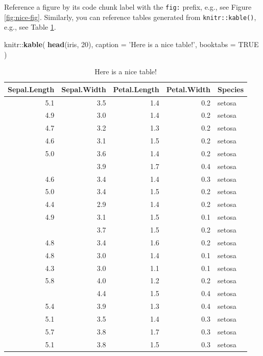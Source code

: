 \documentclass[]{book}
\newenvironment{Shaded}{\begin{snugshade}}{\end{snugshade}}
\newcommand{\KeywordTok}[1]{\textcolor[rgb]{0.13,0.29,0.53}{\textbf{{#1}}}}
\newcommand{\DataTypeTok}[1]{\textcolor[rgb]{0.13,0.29,0.53}{{#1}}}
\newcommand{\DecValTok}[1]{\textcolor[rgb]{0.00,0.00,0.81}{{#1}}}
\newcommand{\StringTok}[1]{\textcolor[rgb]{0.31,0.60,0.02}{{#1}}}
\newcommand{\OtherTok}[1]{\textcolor[rgb]{0.56,0.35,0.01}{{#1}}}
\newcommand{\NormalTok}[1]{{#1}}
\theoremstyle{definition}
\theoremstyle{definition}
\theoremstyle{definition}
\theoremstyle{remark}
\begin{document}
Reference a figure by its code chunk label with the \texttt{fig:}
prefix, e.g., see Figure \ref{fig:nice-fig}. Similarly, you can
reference tables generated from \texttt{knitr::kable()}, e.g., see Table
\ref{tab:nice-tab}.

\begin{Shaded}
\begin{Highlighting}[]
\NormalTok{knitr::}\KeywordTok{kable}\NormalTok{(}
  \KeywordTok{head}\NormalTok{(iris, }\DecValTok{20}\NormalTok{), }\DataTypeTok{caption =} \StringTok{'Here is a nice table!'}\NormalTok{,}
  \DataTypeTok{booktabs =} \OtherTok{TRUE}
\NormalTok{)}
\end{Highlighting}
\end{Shaded}

\begin{table}

\caption{\label{tab:nice-tab}Here is a nice table!}
\centering
\begin{tabular}[t]{rrrrl}
\toprule
Sepal.Length & Sepal.Width & Petal.Length & Petal.Width & Species\\
\midrule
5.1 & 3.5 & 1.4 & 0.2 & setosa\\
4.9 & 3.0 & 1.4 & 0.2 & setosa\\
4.7 & 3.2 & 1.3 & 0.2 & setosa\\
4.6 & 3.1 & 1.5 & 0.2 & setosa\\
5.0 & 3.6 & 1.4 & 0.2 & setosa\\
\addlinespace
5.4 & 3.9 & 1.7 & 0.4 & setosa\\
4.6 & 3.4 & 1.4 & 0.3 & setosa\\
5.0 & 3.4 & 1.5 & 0.2 & setosa\\
4.4 & 2.9 & 1.4 & 0.2 & setosa\\
4.9 & 3.1 & 1.5 & 0.1 & setosa\\
\addlinespace
5.4 & 3.7 & 1.5 & 0.2 & setosa\\
4.8 & 3.4 & 1.6 & 0.2 & setosa\\
4.8 & 3.0 & 1.4 & 0.1 & setosa\\
4.3 & 3.0 & 1.1 & 0.1 & setosa\\
5.8 & 4.0 & 1.2 & 0.2 & setosa\\
\addlinespace
5.7 & 4.4 & 1.5 & 0.4 & setosa\\
5.4 & 3.9 & 1.3 & 0.4 & setosa\\
5.1 & 3.5 & 1.4 & 0.3 & setosa\\
5.7 & 3.8 & 1.7 & 0.3 & setosa\\
5.1 & 3.8 & 1.5 & 0.3 & setosa\\
\bottomrule
\end{tabular}
\end{table}
\end{document}
